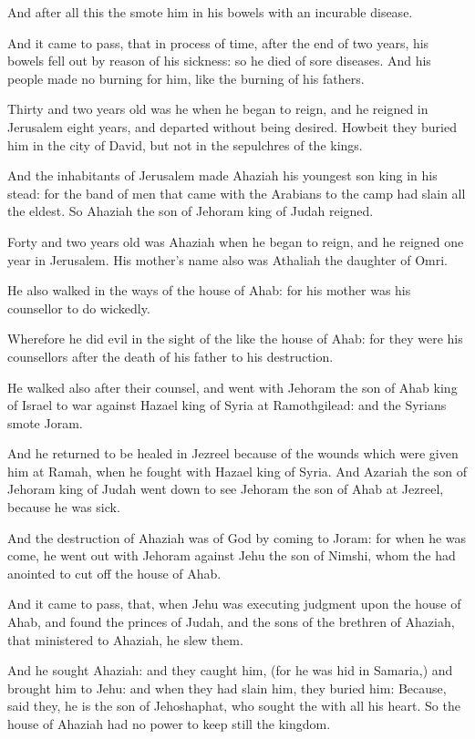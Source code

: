 \Verse And after all this the \LORD smote him in his bowels with an incurable disease.

\Verse And it came to pass, that in process of time, after the end of two years, his bowels fell out by reason of his sickness: so he died of sore diseases. And his people made no burning for him, like the burning of his fathers.

\Verse Thirty and two years old was he when he began to reign, and he reigned in Jerusalem eight years, and departed without being desired.  Howbeit they buried him in the city of David, but not in the sepulchres of the kings.


\Chapter
\Verse And the inhabitants of Jerusalem made Ahaziah his youngest son king in his stead: for the band of men that came with the Arabians to the camp had slain all the eldest. So Ahaziah the son of Jehoram king of Judah reigned.

\Verse Forty and two years old was Ahaziah when he began to reign, and he reigned one year in Jerusalem. His mother's name also was Athaliah the daughter of Omri.

\Verse He also walked in the ways of the house of Ahab: for his mother was his counsellor to do wickedly.

\Verse Wherefore he did evil in the sight of the \LORD like the house of Ahab: for they were his counsellors after the death of his father to his destruction.

\Verse He walked also after their counsel, and went with Jehoram the son of Ahab king of Israel to war against Hazael king of Syria at Ramothgilead: and the Syrians smote Joram.

\Verse And he returned to be healed in Jezreel because of the wounds which were given him at Ramah, when he fought with Hazael king of Syria. And Azariah the son of Jehoram king of Judah went down to see Jehoram the son of Ahab at Jezreel, because he was sick.

\Verse And the destruction of Ahaziah was of God by coming to Joram: for when he was come, he went out with Jehoram against Jehu the son of Nimshi, whom the \LORD had anointed to cut off the house of Ahab.

\Verse And it came to pass, that, when Jehu was executing judgment upon the house of Ahab, and found the princes of Judah, and the sons of the brethren of Ahaziah, that ministered to Ahaziah, he slew them.

\Verse And he sought Ahaziah: and they caught him, (for he was hid in Samaria,) and brought him to Jehu: and when they had slain him, they buried him: Because, said they, he is the son of Jehoshaphat, who sought the \LORD with all his heart. So the house of Ahaziah had no power to keep still the kingdom.

